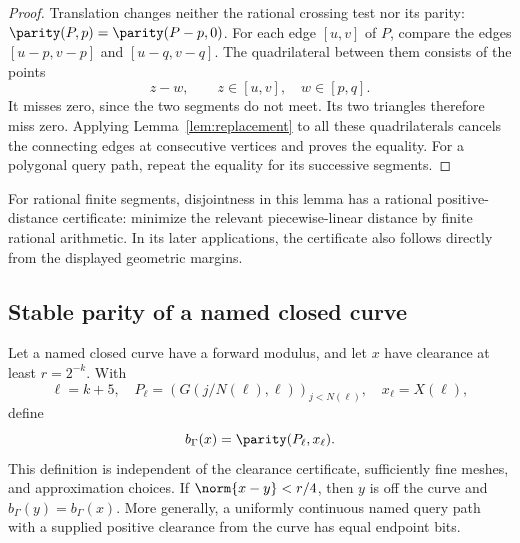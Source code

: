 \begin{proof}
Translation changes neither the rational crossing test nor its parity:
$\parity(P,p)=\parity(P-p,0)$. For each edge $[u,v]$ of $P$, compare
the edges $[u-p,v-p]$ and $[u-q,v-q]$. The quadrilateral between them
consists of the points
\[
           z-w,\qquad z\in[u,v],\quad w\in[p,q].
\]
It misses zero, since the two segments do not meet. Its two
triangles therefore miss zero. Applying
Lemma~\ref{lem:replacement} to all these quadrilaterals cancels the
connecting edges at consecutive vertices and proves the equality.
For a polygonal query path, repeat the equality for its successive
segments.
\end{proof}

For rational finite segments, disjointness in this lemma has a rational
positive-distance certificate: minimize the relevant piecewise-linear
distance by finite rational arithmetic. In its later applications,
the certificate also follows directly from the displayed geometric
margins.

\subsection{Stable parity of a named closed curve}

\begin{proposition}\label{prop:stable}
Let a named closed curve have a forward modulus, and let $x$ have
clearance at least $r=2^{-k}$. With
\[
 \ell=k+5,\quad
 P_\ell=(G(j/N(\ell),\ell))_{j<N(\ell)},\quad
 x_\ell=X(\ell),
\]
define
\begin{equation}
 b_\Gamma(x)=\parity(P_\ell,x_\ell).
 \label{eq:curvebit}
\end{equation}
This definition is independent of the clearance certificate, sufficiently
fine meshes, and approximation choices. If
$\norm{x-y}<r/4$, then $y$ is off the curve and
$b_\Gamma(y)=b_\Gamma(x)$. More generally, a uniformly continuous
named query path with a supplied positive clearance from the curve
has equal endpoint bits.
\end{proposition}

